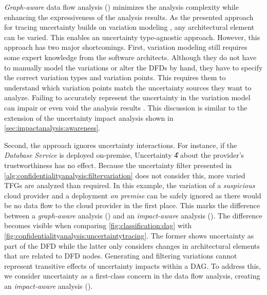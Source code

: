 \emph{Graph-aware} data flow analysis () minimizes the analysis complexity while enhancing the expressiveness of the analysis results.
As the presented approach for tracing uncertainty builds on variation modeling \cite{mehl_palladio_2022,walter_architecture-based_2023}, any architectural element can be varied.
This enables an uncertainty type-agnostic approach.
However, this approach has two major shortcomings.
First, variation modeling still requires some expert knowledge from the software architects.
Although they do not have to manually model the variations or alter the \acp{DFD} by hand, they have to specify the correct variation types and variation points.
This requires them to understand which variation points match the uncertainty sources they want to analyze.
Failing to accurately represent the uncertainty in the variation model can impair or even void the analysis results \cite{hahner_arcn_2024}.
This discussion is similar to the extension of the uncertainty impact analysis shown in \autoref{sec:impactanalysis:awareness}.

Second, the approach ignores uncertainty interactions.
For instance, if the \emph{Database Service} is deployed on-premise, Uncertainty \U{4} about the provider's trustworthiness has no effect.
Because the uncertainty filter presented in \autoref{alg:confidentialityanalysis:filtervariation} does not consider this, more varied \acp{TFG} are analyzed than required.
In this example, the variation of a \emph{suspicious} cloud provider and a deployment \emph{on premise} can be safely ignored as there would be no data flow to the cloud provider in the first place.
This marks the difference between a \emph{graph-aware} analysis () and an \emph{impact-aware} analysis ().
The difference becomes visible when comparing \autoref{fig:classification:dag} with \autoref{fig:confidentialityanalysis:uncertaintytracing}.
The former shows uncertainty as part of the \ac{DFD} while the latter only considers changes in architectural elements that are related to \ac{DFD} nodes.
Generating and filtering variations cannot represent transitive effects of uncertainty impacts within a \ac{DAG}.
To address this, we consider uncertainty as a first-class concern in the data flow analysis, creating an \emph{impact-aware} analysis ().




